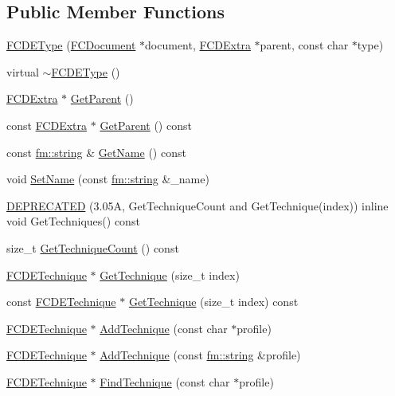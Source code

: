 \subsection*{Public Member Functions}
\begin{DoxyCompactItemize}
\item 
\hyperlink{classFCDEType_a14bd145c3b4f2f5aa0d25852a0698706}{FCDEType} (\hyperlink{classFCDocument}{FCDocument} $\ast$document, \hyperlink{classFCDExtra}{FCDExtra} $\ast$parent, const char $\ast$type)
\item 
virtual \hyperlink{classFCDEType_a0585b376ad36abfec5b8372de2702183}{$\sim$FCDEType} ()
\item 
\hyperlink{classFCDExtra}{FCDExtra} $\ast$ \hyperlink{classFCDEType_a0c4455bac1cc56e108130c2fac32614a}{GetParent} ()
\item 
const \hyperlink{classFCDExtra}{FCDExtra} $\ast$ \hyperlink{classFCDEType_a5d11ad6113e51143be76679257ffac82}{GetParent} () const 
\item 
const \hyperlink{classfm_1_1stringT}{fm::string} \& \hyperlink{classFCDEType_aaf24a742777651135e29fe0002ad88e1}{GetName} () const 
\item 
void \hyperlink{classFCDEType_adb64c87b8153987daac072eb91331dc4}{SetName} (const \hyperlink{classfm_1_1stringT}{fm::string} \&\_\-name)
\item 
\hyperlink{classFCDEType_a9903510035e36fbc7bb5d6c61c3e24ac}{DEPRECATED} (3.05A, GetTechniqueCount and GetTechnique(index)) inline void GetTechniques() const 
\item 
size\_\-t \hyperlink{classFCDEType_a2fd6af3e30446aa929f179bd7a13eeb1}{GetTechniqueCount} () const 
\item 
\hyperlink{classFCDETechnique}{FCDETechnique} $\ast$ \hyperlink{classFCDEType_ab7e8c7c3492e405e82a919a00d2f8396}{GetTechnique} (size\_\-t index)
\item 
const \hyperlink{classFCDETechnique}{FCDETechnique} $\ast$ \hyperlink{classFCDEType_a8372b78313462119a99e6ded4b12e995}{GetTechnique} (size\_\-t index) const 
\item 
\hyperlink{classFCDETechnique}{FCDETechnique} $\ast$ \hyperlink{classFCDEType_ae50b62701aabf46505d13b686794ceae}{AddTechnique} (const char $\ast$profile)
\item 
\hyperlink{classFCDETechnique}{FCDETechnique} $\ast$ \hyperlink{classFCDEType_ade0d9afa15440c67971ae8c78071b86b}{AddTechnique} (const \hyperlink{classfm_1_1stringT}{fm::string} \&profile)
\item 
\hyperlink{classFCDETechnique}{FCDETechnique} $\ast$ \hyperlink{classFCDEType_ae5bd23f477d8a955c61614b75f389e7f}{FindTechnique} (const char $\ast$profile)

\end{DoxyCompactItemize}
